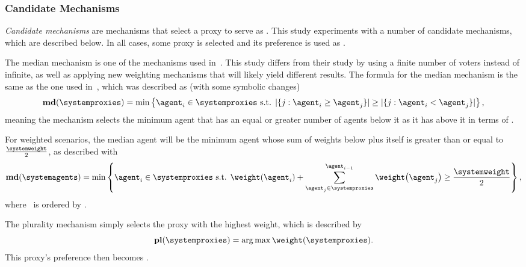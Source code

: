 \subsubsection{Candidate Mechanisms}\label{subsubsec:candidate-mechanisms}
\textit{Candidate mechanisms} are mechanisms that select a proxy to serve as
\systemtruth.  
This study experiments with a number of candidate mechanisms, which are
described below.
In all cases, some proxy is selected and its preference is used as \systemtruth.

\label{para:median}
The median mechanism is one of the mechanisms used in~\cite{Cohensius2017}.  
This study differs from their study by using a finite number of voters instead of
infinite,
as well as applying new weighting mechanisms that will likely yield
different results.
The formula for the median mechanism is the same as the one used
in~\cite[para.~2.4]{Cohensius2017}, which was described as (with some
symbolic changes)
\begin{equation*}
    \textbf{md}(\systemproxies) =
    \min\left\{\agent_i \in \systemproxies \text{ s.t. }
    |\{j: \agent_i \geq \agent_j\}| \geq
    |\{j: \agent_i < \agent_j\}|
    \right\}
    \text{,}
\end{equation*}
meaning the mechanism selects the minimum agent that has an equal or greater
number of agents below it as it has above it in terms of \agenttruth.  

For weighted scenarios, the median agent will be the minimum agent whose sum of
weights below plus itself is greater than or equal to $\frac{\systemweight}{2}$,
as described with
\begin{equation}
    \textbf{md}(\systemagents) = \min\left\{
    \agent_i \in \systemproxies \text{ s.t. }
    \weightof{\agent_i} +
    \sum_{\agent_j \in \systemproxies}^{\agent_{i - 1}} \weightof{\agent_j}
    \geq \frac{\systemweight}{2}
    \right\}
    \text{,}\label{eq:median-mechanism}
\end{equation}
where \systemproxies\ is ordered by \agenttruth.

\label{para:plurality}
The plurality mechanism simply selects the proxy with the highest weight, which is
described by
\begin{equation}
    \textbf{pl}(\systemproxies) =
    \argmax \weightof{\systemproxies}
    \text{.}\label{eq:plurality-mechanism}
\end{equation}
This proxy's preference then becomes \systemtruth.

